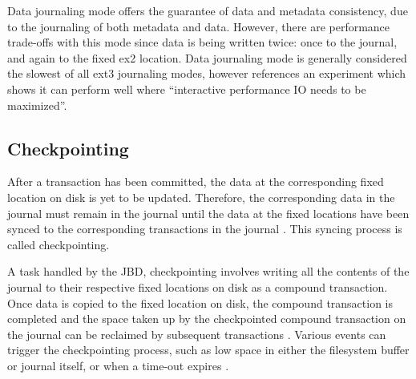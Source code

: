 Data journaling mode offers the guarantee of data and metadata consistency, due to the journaling of both metadata and data. However, there are performance trade-offs with this mode since data is being written twice: once to the journal, and again to the fixed ex2 location. Data journaling mode is generally considered the slowest of all ext3 journaling modes, however \citet[p. 3]{Robbins2001b} references an experiment which shows it can perform well where ``interactive performance IO needs to be maximized''.

\subsection{Checkpointing}

After a transaction has been committed, the data at the corresponding fixed location on disk is yet to be updated. Therefore, the corresponding data in the journal must remain in the journal until the data at the fixed locations have been synced to the corresponding transactions in the journal \citep{Tweedie1998}. This syncing process is called checkpointing.

A task handled by the JBD, checkpointing involves writing all the contents of the journal to their respective fixed locations on disk as a compound transaction. Once data is copied to the fixed location on disk, the compound transaction is completed and the space taken up by the checkpointed compound transaction on the journal can be reclaimed by subsequent transactions \citep{Tweedie2000, Tweedie1998, Prabhakaran2005a, Katiyar2011, Devlisden2011}. Various events can trigger the checkpointing process, such as low space in either the filesystem buffer or journal itself, or when a time-out expires \citep{Prabhakaran2005a}.



